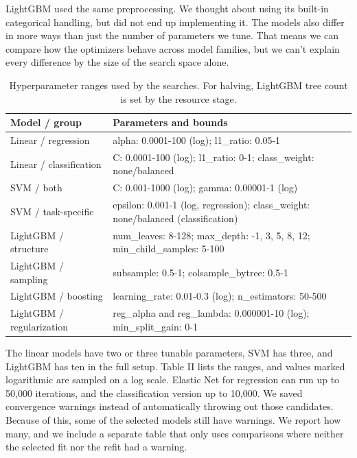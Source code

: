 \documentclass[12pt,letterpaper]{article}
\begin{document}
LightGBM used the same preprocessing. We thought about using its built-in categorical handling, but did not end up implementing it. The models also differ in more ways than just the number of parameters we tune. That means we can compare how the optimizers behave across model families, but we can't explain every difference by the size of the search space alone.

\begin{table}[t]
\centering
\caption{Hyperparameter ranges used by the searches. For halving, LightGBM tree count is set by the resource stage.}
\label{tab:spaces}
\fontsize{10}{12}\selectfont
\setlength{\tabcolsep}{3.3pt}
\begin{tabular}{p{}p{}}
\toprule
Model / group & Parameters and bounds \\
\midrule
Linear / regression & alpha: 0.0001-100 (log); l1\_ratio: 0.05-1 \\
Linear / classification & C: 0.0001-100 (log); l1\_ratio: 0-1; class\_weight: none/balanced \\
SVM / both & C: 0.001-1000 (log); gamma: 0.00001-1 (log) \\
SVM / task-specific & epsilon: 0.001-1 (log, regression); class\_weight: none/balanced (classification) \\
LightGBM / structure & num\_leaves: 8-128; max\_depth: -1, 3, 5, 8, 12; min\_child\_samples: 5-100 \\
LightGBM / sampling & subsample: 0.5-1; colsample\_bytree: 0.5-1 \\
LightGBM / boosting & learning\_rate: 0.01-0.3 (log); n\_estimators: 50-500 \\
LightGBM / regularization & reg\_alpha and reg\_lambda: 0.000001-10 (log); min\_split\_gain: 0-1 \\
\bottomrule
\end{tabular}
\end{table}

The linear models have two or three tunable parameters, SVM has three, and LightGBM has ten in the full setup. Table II lists the ranges, and values marked logarithmic are sampled on a log scale. Elastic Net for regression can run up to 50,000 iterations, and the classification version up to 10,000. We saved convergence warnings instead of automatically throwing out those candidates. Because of this, some of the selected models still have warnings. We report how many, and we include a separate table that only uses comparisons where neither the selected fit nor the refit had a warning.
\end{document}
